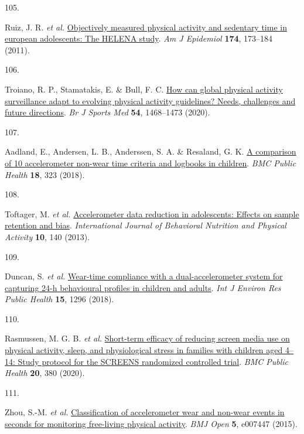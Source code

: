 \documentclass[
  10pt,
]{scrbook}
\newlength{\cslhangindent}
\newlength{\csllabelwidth}
\newlength{\cslentryspacingunit} %
\newenvironment{CSLReferences}[2] %
 {%
  \setlength{\parindent}{0pt}
  \ifodd #1
  \let\oldpar\par
  \def\par{\hangindent=\cslhangindent\oldpar}
  \fi
  \setlength{\parskip}{#2\cslentryspacingunit}
 }%
 {}
\newcommand{\CSLLeftMargin}[1]{\parbox[t]{\csllabelwidth}{#1}}
\newcommand{\CSLRightInline}[1]{\parbox[t]{\linewidth - \csllabelwidth}{#1}\break}
\let\originaltextbf\textbf
\renewcommand{\textbf}[1]{\textcolor{color1}{\textsf{\originaltextbf{#1}}}}
\begin{document}
\begin{CSLReferences}{0}{0}
\leavevmode{}%
\CSLLeftMargin{105. }%
\CSLRightInline{Ruiz, J. R. \emph{et al.}
\href{https://doi.org/10.1093/aje/kwr068}{Objectively measured physical
activity and sedentary time in european adolescents: The {HELENA}
study}. \emph{Am J Epidemiol} \textbf{174}, 173--184 (2011).}

\leavevmode{}%
\CSLLeftMargin{106. }%
\CSLRightInline{Troiano, R. P., Stamatakis, E. \& Bull, F. C.
\href{https://doi.org/10.1136/bjsports-2020-102621}{How can global
physical activity surveillance adapt to evolving physical activity
guidelines? Needs, challenges and future directions}. \emph{Br J Sports
Med} \textbf{54}, 1468--1473 (2020).}

\leavevmode{}%
\CSLLeftMargin{107. }%
\CSLRightInline{Aadland, E., Andersen, L. B., Anderssen, S. A. \&
Resaland, G. K. \href{https://doi.org/10.1186/s12889-018-5212-4}{A
comparison of 10 accelerometer non-wear time criteria and logbooks in
children}. \emph{{BMC} Public Health} \textbf{18}, 323 (2018).}

\leavevmode{}%
\CSLLeftMargin{108. }%
\CSLRightInline{Toftager, M. \emph{et al.}
\href{https://doi.org/10.1186/1479-5868-10-140}{Accelerometer data
reduction in adolescents: Effects on sample retention and bias}.
\emph{International Journal of Behavioral Nutrition and Physical
Activity} \textbf{10}, 140 (2013).}

\leavevmode{}%
\CSLLeftMargin{109. }%
\CSLRightInline{Duncan, S. \emph{et al.}
\href{https://doi.org/10.3390/ijerph15071296}{Wear-time compliance with
a dual-accelerometer system for capturing 24-h behavioural profiles in
children and adults}. \emph{Int J Environ Res Public Health}
\textbf{15}, 1296 (2018).}

\leavevmode{}%
\CSLLeftMargin{110. }%
\CSLRightInline{Rasmussen, M. G. B. \emph{et al.}
\href{https://doi.org/10.1186/s12889-020-8458-6}{Short-term efficacy of
reducing screen media use on physical activity, sleep, and physiological
stress in families with children aged 4--14: Study protocol for the
{SCREENS} randomized controlled trial}. \emph{{BMC} Public Health}
\textbf{20}, 380 (2020).}

\leavevmode{}%
\CSLLeftMargin{111. }%
\CSLRightInline{Zhou, S.-M. \emph{et al.}
\href{https://doi.org/10.1136/bmjopen-2014-007447}{Classification of
accelerometer wear and non-wear events in seconds for monitoring
free-living physical activity}. \emph{{BMJ} Open} \textbf{5}, e007447
(2015).}


\end{CSLReferences}
\end{document}
